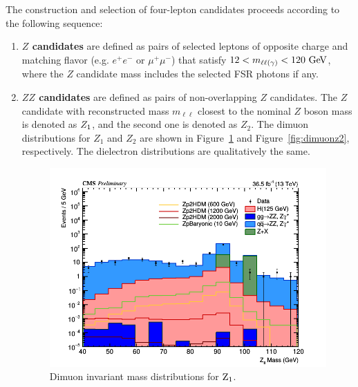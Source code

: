 The construction and selection of four-lepton candidates proceeds 
according to the following sequence:
\begin{enumerate}
\item {\bf $Z$ candidates} are defined as pairs of selected leptons
 of opposite charge and matching flavor (e.g. $e^+ e^-$ or $\mu^+\mu^-$)
 that satisfy $12 < m_{\ell\ell(\gamma)} < 120~\mathrm{Ge\kern -0.1em V}$, where the $Z$ candidate mass
 includes the selected FSR photons if any.
\item {\bf $ZZ$ candidates} are defined as pairs of non-overlapping $Z$ candidates.
 The $Z$ candidate with reconstructed mass $m_{\ell\ell}$ closest to the nominal $Z$ boson
 mass is denoted as $Z_1$, and the second one is denoted as $Z_2$. The dimuon distributions for $Z_1$ and $Z_2$ are shown in Figure~\ref{fig:dimuonz1} and Figure~\ref{fig:dimuonz2}, respectively. The dielectron distributions are qualitatively the same.

\begin{figure}[tbh]
\centering
\includegraphics[width=5.5in]{figures/hist_hMZ1_8.png}
    \caption{Dimuon invariant mass distributions for ${\rm Z_1}$.}
    \label{fig:dimuonz1}
\end{figure}


\end{enumerate}
